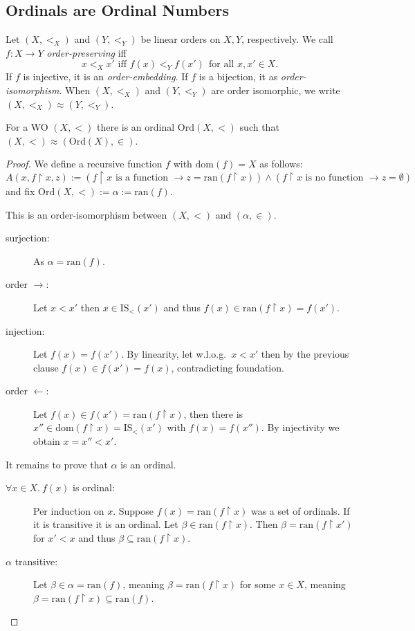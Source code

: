 \documentclass{whrartcl}
\newcommand{\dom}{\text{dom}}
\newcommand{\ran}{\text{ran}}
\newcommand{\IS}{\text{IS}}
\newcommand{\ord}{\text{Ord}}
\newcommand{\uh}{\upharpoonright}
\begin{document}
\subsection{Ordinals are Ordinal Numbers}

\begin{definition}
  Let $(X, <_X)$ and $(Y, <_Y)$ be linear orders on $X, Y$, respectively. We call $f : X
  \to Y$ \emph{order-preserving} iff
  \[
    x <_X x' \text{ iff } f(x) <_Y f(x') ~~\text{for all } x, x' \in X.
  \]
  If $f$ is injective, it is an \emph{order-embedding}. If $f$ is a bijection,
  it as \emph{order-isomorphism}.
  When $(X, <_X)$ and $(Y, <_Y)$ are order isomorphic, we write $(X, <_X) \approx (Y,<_Y)$.
\end{definition}

\begin{theorem}
  For a WO $(X, <)$ there is an ordinal $\ord(X, <)$ such that
  $(X, <) \approx (\ord(X), \in)$.
\end{theorem}
\begin{proof}
  We define a recursive function $f$ with $\dom(f) = X$ as follows:
  \[
    A(x, f \uh x, z) := (f \uh x \text{ is a function } \to z = \ran(f \uh x))
    \wedge (f \uh x \text{ is no function } \to z = \emptyset)
  \]
  and fix $\ord(X, <) := \alpha := \ran(f)$.

  This is an order-isomorphism between $(X, <)$ and $(\alpha, \in)$.
  \begin{description}
  \item[surjection:] As $\alpha = \ran(f)$.
  \item[order $\to$:] Let $x < x'$ then $x \in \IS_<(x')$ and thus $f(x) \in
    \ran(f \uh x) = f(x')$.
  \item[injection:] Let $f(x) = f(x')$. By linearity, let w.l.o.g.\ $x < x'$
    then by the previous clause $f(x) \in f(x') = f(x)$, contradicting foundation.
  \item[order $\leftarrow$:] Let $f(x) \in f(x') = \ran(f \uh x)$, then there is
    $x'' \in \dom(f \uh x) = \IS_<(x')$ with $f(x) = f(x'')$. By injectivity we
    obtain $x = x'' < x'$.
  \end{description}

  It remains to prove that $\alpha$ is an ordinal.
  \begin{description}
  \item[$\forall x \in X.~f(x)$ is ordinal:] Per induction on $x$. Suppose $f(x) = \ran(f \uh x)$ was a
    set of ordinals. If it is transitive it is an ordinal. Let $\beta
    \in \ran(f \uh x)$. Then $\beta = \ran(f \uh x')$ for $x' < x$ and thus
    $\beta \subseteq \ran(f \uh x)$.
  \item[$\alpha$ transitive:] Let $\beta \in \alpha = \ran(f)$, meaning $\beta = \ran(f
    \uh x)$ for some $x \in X$, meaning $\beta = \ran(f \uh x) \subseteq \ran(f)$.
  \end{description}
\end{proof}
\end{document}
